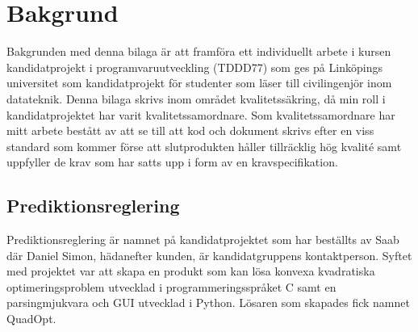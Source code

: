\section{Bakgrund}
Bakgrunden med denna bilaga är att framföra ett individuellt arbete i kursen kandidatprojekt i programvaruutveckling (TDDD77) som ges på Linköpings universitet som kandidatprojekt för studenter som läser till civilingenjör inom datateknik. 
\newline
\newline
Denna bilaga skrivs inom området kvalitetssäkring, då min roll i kandidatprojektet har varit kvalitetssamordnare. Som kvalitetssamordnare har mitt arbete bestått av att se till att kod och dokument skrivs efter en viss standard som kommer förse att slutprodukten håller tillräcklig hög kvalité samt uppfyller de krav som har satts upp i form av en kravspecifikation.

\subsection{Prediktionsreglering}
Prediktionsreglering är namnet på kandidatprojektet som har beställts av Saab där Daniel Simon, hädanefter kunden, är kandidatgruppens kontaktperson. Syftet med projektet var att skapa en produkt som kan lösa konvexa kvadratiska optimeringsproblem utvecklad i programmeringsspråket C samt en parsingmjukvara och GUI utvecklad i Python. Lösaren som skapades fick namnet QuadOpt.
